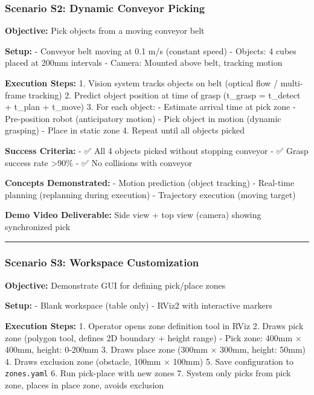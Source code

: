 \documentclass[
]{article}
\begin{document}
\hypertarget{scenario-s2-dynamic-conveyor-picking}{%
\subsubsection{Scenario S2: Dynamic Conveyor
Picking}\label{scenario-s2-dynamic-conveyor-picking}}

\textbf{Objective:} Pick objects from a moving conveyor belt

\textbf{Setup:} - Conveyor belt moving at 0.1 m/s (constant speed) -
Objects: 4 cubes placed at 200mm intervals - Camera: Mounted above belt,
tracking motion

\textbf{Execution Steps:} 1. Vision system tracks objects on belt
(optical flow / multi-frame tracking) 2. Predict object position at time
of grasp (t\_grasp = t\_detect + t\_plan + t\_move) 3. For each object:
- Estimate arrival time at pick zone - Pre-position robot (anticipatory
motion) - Pick object in motion (dynamic grasping) - Place in static
zone 4. Repeat until all objects picked

\textbf{Success Criteria:} - ✅ All 4 objects picked without stopping
conveyor - ✅ Grasp success rate \textgreater90\% - ✅ No collisions
with conveyor

\textbf{Concepts Demonstrated:} - Motion prediction (object tracking) -
Real-time planning (replanning during execution) - Trajectory execution
(moving target)

\textbf{Demo Video Deliverable:} Side view + top view (camera) showing
synchronized pick

\begin{center}\rule{0.5\linewidth}{0.5pt}\end{center}

\hypertarget{scenario-s3-workspace-customization}{%
\subsubsection{Scenario S3: Workspace
Customization}\label{scenario-s3-workspace-customization}}

\textbf{Objective:} Demonstrate GUI for defining pick/place zones

\textbf{Setup:} - Blank workspace (table only) - RViz2 with interactive
markers

\textbf{Execution Steps:} 1. Operator opens zone definition tool in RViz
2. Draws pick zone (polygon tool, defines 2D boundary + height range) -
Pick zone: 400mm × 400mm, height: 0-200mm 3. Draws place zone (300mm ×
300mm, height: 50mm) 4. Draws exclusion zone (obstacle, 100mm × 100mm)
5. Save configuration to \texttt{zones.yaml} 6. Run pick-place with new
zones 7. System only picks from pick zone, places in place zone, avoids
exclusion
\end{document}
